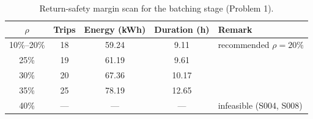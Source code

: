 \documentclass[journal]{IEEEtran}
\begin{document}
\begin{table}[t]
\centering
\footnotesize
\setlength{\tabcolsep}{3pt}
\caption{Return-safety margin scan for the batching stage (Problem 1).}
\label{tab:margin}
\begin{tabular}{ccccl}
\toprule
$\rho$ & Trips & Energy (kWh) & Duration (h) & Remark \\
\midrule
10\%--20\% & 18 & 59.24 & 9.11 & recommended $\rho{=}20\%$ \\
25\% & 19 & 61.19 & 9.61 & \\
30\% & 20 & 67.36 & 10.17 & \\
35\% & 25 & 78.19 & 12.65 & \\
40\% & --- & --- & --- & infeasible (S004, S008) \\
\bottomrule
\end{tabular}
\end{table}
\end{document}
